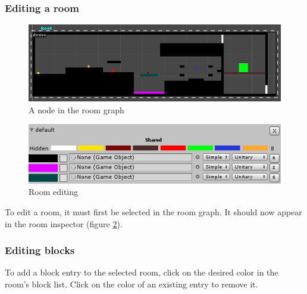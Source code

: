 \documentclass[a4paper]{article}
\begin{document}
	
	\subsubsection{Editing a room}
	\begin{figure}[h]
		\includegraphics[width=\linewidth]{img/Node_Room.PNG}
		\caption{A node in the room graph}
		\label{fig:node_room}
	\end{figure}
	
	\begin{figure}[h]
		\includegraphics[width=\linewidth]{img/Menu_EditRoom.PNG}
		\caption{Room editing}
		\label{fig:edit_room}
	\end{figure}
	
	To edit a room, it must first be selected in the room graph. It should now appear in the room inspector (figure \ref{fig:edit_room}). 
	
	\subsubsection{Editing blocks}
	To add a block entry to the selected room, click on the desired color in the room's block list. Click on the color of an existing entry to remove it.  
\end{document}
